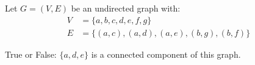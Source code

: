 \begin{prob}

    Let $G = (V,E)$ be an undirected graph with:
    \begin{align*}
        V &= \{a, b, c, d, e, f, g\} \\
        E &= \{ (a, c), (a, d), (a, e), (b, g), (b, f) \}
    \end{align*}

    True or False: $\{a, d, e\}$ is a connected component of this graph.

    \tF{}

\end{prob}
